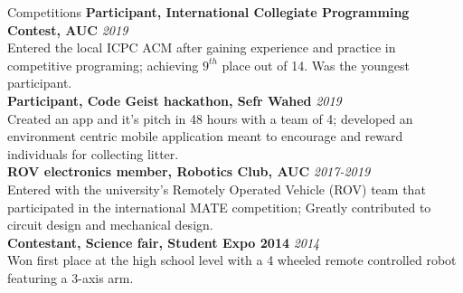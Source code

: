 \documentclass{resume}
\begin{document}
\begin{small}
	\begin{rSection}{Competitions}
		{\bf Participant, International Collegiate Programming Contest, AUC} \hfill {\em 2019} \\
		Entered the local ICPC ACM after gaining experience and practice in competitive programing; achieving $9^{th}$ place out of 14. Was the youngest participant. \\
		{\bf Participant, Code Geist hackathon, Sefr Wahed} \hfill {\em 2019} \\
		Created an app and it's pitch in 48 hours with a team of 4; developed an environment centric mobile application meant to encourage and reward individuals for collecting litter.\\
		{\bf ROV electronics member, Robotics Club, AUC} \hfill {\em 2017-2019} \\
		Entered with the university's Remotely Operated Vehicle (ROV) team that participated in the international MATE competition; Greatly contributed to circuit design and mechanical design. \\
		{\bf Contestant, Science fair, Student Expo 2014} \hfill {\em 2014} \\
		Won first place at the high school level with a 4 wheeled remote controlled robot featuring a 3-axis arm.
	\end{rSection}
	

\end{small}
\end{document}
